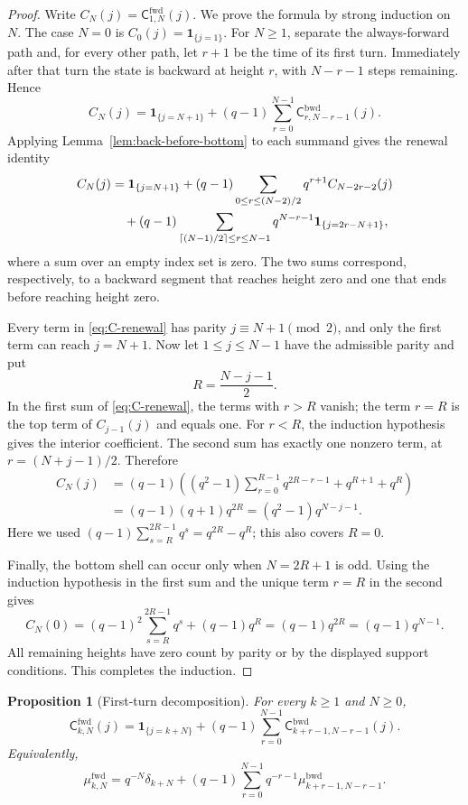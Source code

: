 \documentclass[11pt]{amsart}
\theoremstyle{definition}
\theoremstyle{plain}
\newtheorem{proposition}[definition]{Proposition}
\newcommand{\fwd}{\mathrm{fwd}}
\newcommand{\bwd}{\mathrm{bwd}}
\begin{document}
\begin{proof}
Write \(C_N(j)=\mathsf C^{\fwd}_{1,N}(j)\).  We prove the formula by strong
induction on \(N\).  The case \(N=0\) is \(C_0(j)=\mathbf 1_{\{j=1\}}\).
For \(N\ge1\), separate the always-forward path and, for every other path, let
\(r+1\) be the time of its first turn.  Immediately after that turn the state
is backward at height \(r\), with \(N-r-1\) steps remaining.  Hence
\[
C_N(j)=\mathbf 1_{\{j=N+1\}}+(q-1)\sum_{r=0}^{N-1}
       \mathsf C^{\bwd}_{r,N-r-1}(j).
\]
Applying Lemma~\ref{lem:back-before-bottom} to each summand gives the renewal
identity
\begin{align}\label{eq:C-renewal}
C_N(j)
&=\mathbf 1_{\{j=N+1\}}
 +(q-1)\sum_{0\le r\le (N-2)/2}q^{r+1}C_{N-2r-2}(j) \notag\\
&\quad +(q-1)
 \sum_{\lceil(N-1)/2\rceil\le r\le N-1}
 q^{N-r-1}\mathbf 1_{\{j=2r-N+1\}},
\end{align}
where a sum over an empty index set is zero.  The two sums correspond,
respectively, to a backward segment that reaches height zero and one that ends
before reaching height zero.

Every term in \eqref{eq:C-renewal} has parity \(j\equiv N+1\pmod2\), and only
the first term can reach \(j=N+1\).  Now let
\(1\le j\le N-1\) have the admissible parity and put
\[
R=\frac{N-j-1}{2}.
\]
In the first sum of \eqref{eq:C-renewal}, the terms with \(r>R\) vanish; the
term \(r=R\) is the top term of \(C_{j-1}(j)\) and equals one.  For \(r<R\),
the induction hypothesis gives the interior coefficient.  The second sum has
exactly one nonzero term, at \(r=(N+j-1)/2\).  Therefore
\begin{align*}
C_N(j)
 &=(q-1)\left((q^2-1)\sum_{r=0}^{R-1}q^{2R-r-1}
                    +q^{R+1}+q^R\right)\\
 &=(q-1)(q+1)q^{2R}
  =(q^2-1)q^{N-j-1}.
\end{align*}
Here we used
\((q-1)\sum_{s=R}^{2R-1}q^s=q^{2R}-q^R\); this also covers \(R=0\).

Finally, the bottom shell can occur only when \(N=2R+1\) is odd.  Using the
induction hypothesis in the first sum and the unique term \(r=R\) in the
second gives
\[
C_N(0)
 =(q-1)^2\sum_{s=R}^{2R-1}q^s+(q-1)q^R
 =(q-1)q^{2R}=(q-1)q^{N-1}.
\]
All remaining heights have zero count by parity or by the displayed support
conditions.  This completes the induction.
\end{proof}

\begin{proposition}[First-turn decomposition]\label{prop:first-turn}
For every \(k\ge1\) and \(N\ge0\),
\[
\mathsf C^{\fwd}_{k,N}(j)=\mathbf 1_{\{j=k+N\}}+(q-1)\sum_{r=0}^{N-1}
\mathsf C^{\bwd}_{k+r-1,N-r-1}(j).
\]
Equivalently,
\begin{equation}\label{eq:first-turn-normalized}
\mu^{\fwd}_{k,N}=q^{-N}\delta_{k+N}
 +(q-1)\sum_{r=0}^{N-1}q^{-r-1}\mu^{\bwd}_{k+r-1,N-r-1}.
\end{equation}
\end{proposition}
\end{document}
